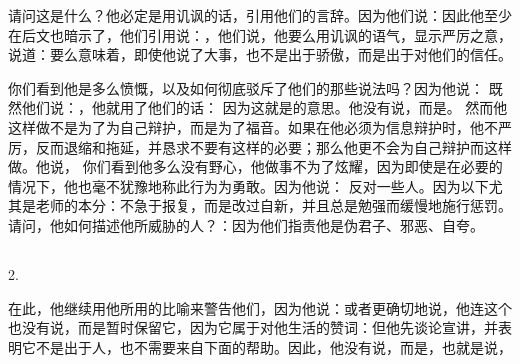 请问这是什么？他必定是用讥讽的话，引用他们的言辞。因为他们说：因此他至少在后文也暗示了，他们引用说：，他们说，他要么用讥讽的语气，显示严厉之意，说道：要么意味着，即使他说了大事，也不是出于骄傲，而是出于对他们的信任。\par

 你们看到他是多么愤慨，以及如何彻底驳斥了他们的那些说法吗？因为他说： 既然他们说：，他就用了他们的话： 因为这就是的意思。他没有说，而是。 然而他这样做不是为了为自己辩护，而是为了福音。如果在他必须为信息辩护时，他不严厉，反而退缩和拖延，并恳求不要有这样的必要；那么他更不会为自己辩护而这样做。他说， 你们看到他多么没有野心，他做事不为了炫耀，因为即使是在必要的情况下，他也毫不犹豫地称此行为为勇敢。因为他说： 反对一些人。因为以下尤其是老师的本分：不急于报复，而是改过自新，并且总是勉强而缓慢地施行惩罚。请问，他如何描述他所威胁的人？：因为他们指责他是伪君子、邪恶、自夸。\par


\subsection{}

2. \par

在此，他继续用他所用的比喻来警告他们，因为他说：或者更确切地说，他连这个也没有说，而是暂时保留它，因为它属于对他生活的赞词：但他先谈论宣讲，并表明它不是出于人，也不需要来自下面的帮助。因此，他没有说，而是，也就是说，\par

